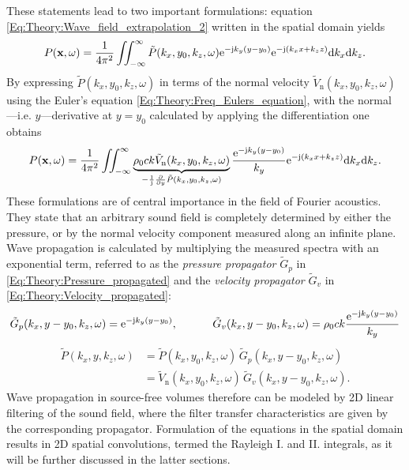 \vspace{3mm}
These statements lead to two important formulations:
equation \eqref{Eq:Theory:Wave_field_extrapolation_2} written in the spatial domain yields
\begin{equation}
P(\mathbf{x},\omega) = \frac{1}{4\pi^2}\iint_{-\infty}^{\infty} \tilde{P}(k_x,y_0,k_z,\omega) \mathrm{e}^{-\mathrm{j} k_y ( y - y_0 ) }  \mathrm{e}^{- \mathrm{j} \left( k_x x  + k_z z \right) }
\mathrm{d} k_x\mathrm{d} k_z.
\label{Eq:Theory:Pressure_propagated}
\end{equation}
By expressing $\tilde{P}(k_x,y_0,k_z,\omega)$ in terms of the normal velocity $\tilde{V}_{\mathrm{n}}(k_x,y_0,k_z,\omega)$ using the Euler's equation  \eqref{Eq:Theory:Freq_Eulers_equation}, with the normal ---i.e. $y$---derivative at $y = y_0$ calculated by applying the differentiation one obtains
\begin{equation}
P(\mathbf{x},\omega) = \frac{1}{4\pi^2}\iint_{-\infty}^{\infty} 
\underbrace{ \rho_0 c k \tilde{V}_{\mathrm{n}}(k_x,y_0,k_z,\omega)}_{-\frac{1}{\mathrm{j}} \frac{\partial}{\partial y} \tilde{P}(k_x,y_0,k_z,\omega) }
\frac{\mathrm{e}^{-\mathrm{j} k_y ( y - y_0 ) } }{k_y} \mathrm{e}^{- \mathrm{j} \left( k_x x + k_z z \right) }
\mathrm{d} k_x\mathrm{d} k_z.
\label{Eq:Theory:Velocity_propagated}
\end{equation}
These formulations are of central importance in the field of Fourier acoustics. 
They state that an arbitrary sound field is completely determined by either the pressure, or by the normal velocity component measured along an infinite plane. 
Wave propagation is calculated by multiplying the measured spectra with an exponential term, referred to as the \emph{pressure propagator} $\tilde{G}_p$ in \eqref{Eq:Theory:Pressure_propagated} and the \emph{velocity propagator} $\tilde{G}_v$ in \eqref{Eq:Theory:Velocity_propagated}:
\begin{equation}
\tilde{G}_p(k_x,y-y_0,k_z,\omega) = \mathrm{e}^{-\mathrm{j} k_y ( y - y_0 ) } ,\ \hspace{1cm}
\tilde{G}_v(k_x,y-y_0,k_z,\omega) = \rho_0 c k \frac{\mathrm{e}^{-\mathrm{j} k_y ( y - y_0 ) } }{k_y}
\label{Eq:Theory:propagators}
\end{equation}
\begin{align}
\tilde{P}(k_x,y,k_z,\omega) &= \tilde{P}(k_x,y_0,k_z,\omega) \, \tilde{G}_p(k_x,y-y_0,k_z,\omega) \\
                            &= \tilde{V}_{\mathrm{n}}(k_x,y_0,k_z,\omega) \, \tilde{G}_v(k_x,y-y_0,k_z,\omega).
\end{align}
Wave propagation in source-free volumes therefore can be modeled by 2D linear filtering of the sound field, where the filter transfer characteristics are given by the corresponding propagator.
Formulation of the equations in the spatial domain results in 2D spatial convolutions, termed the Rayleigh I. and II. integrals, as it will be further discussed in the latter sections.

